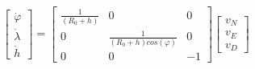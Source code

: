 



\pagebreak

\begin{align}
\begin{bmatrix}
\dot{\varphi}\\
\dot{\lambda}\\
\dot{h}
\end{bmatrix}
=
\begin{bmatrix}
\frac{1}{(R_0+h)} & 0 & 0 \\
0 & \frac{1}{(R_0+h)cos(\varphi)} & 0\\
0 & 0 & -1
\end{bmatrix}
\begin{bmatrix}
v_N \\
v_E \\
v_D
\end{bmatrix}
\label{Eq.v_n}
\end{align}








